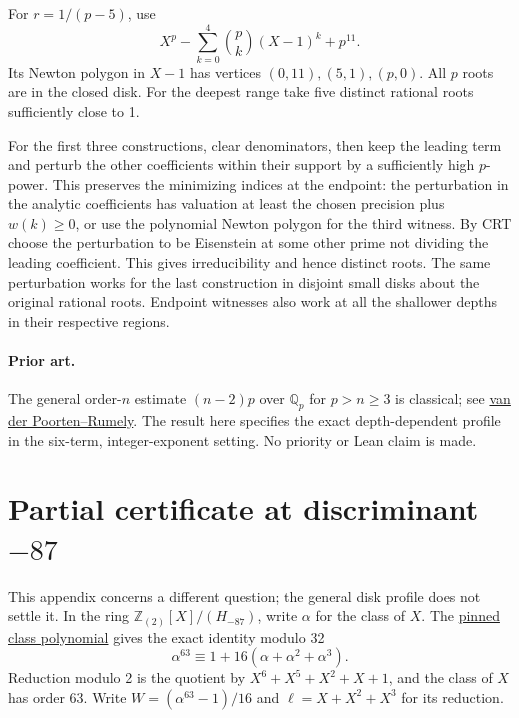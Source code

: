 \documentclass[11pt]{article}
\begin{document}
For \(r=1/(p-5)\), use
\[
 X^p-\sum_{k=0}^4\binom pk(X-1)^k+p^{11}.
\]
Its Newton polygon in \(X-1\) has vertices \((0,11),(5,1),(p,0)\).
All \(p\) roots are in the closed disk. For the deepest range take
five distinct rational roots sufficiently close to 1.

For the first three constructions, clear denominators, then keep
the leading term and perturb the other coefficients within their
support by a sufficiently high \(p\)-power. This preserves the
minimizing indices at the endpoint: the perturbation in the
analytic coefficients has valuation at least the chosen precision
plus \(w(k)\ge0\), or use the polynomial Newton polygon for the
third witness. By CRT choose the perturbation to be Eisenstein at
some other prime not dividing the leading coefficient.
This gives irreducibility and hence distinct roots. The same
perturbation works for the last construction in disjoint small
disks about the original rational roots. Endpoint witnesses also
work at all the shallower depths in their respective regions.

\paragraph{Prior art.}
The general order-\(n\) estimate \((n-2)p\) over \(\mathbb Q_p\)
for \(p>n\ge3\) is classical; see
\href{https://doi.org/10.1112/jlms/s2-36.1.1}{van der Poorten--Rumely}.
The result here specifies the exact depth-dependent profile in the
six-term, integer-exponent setting. No priority or Lean claim is made.
\newpage
\section{Partial certificate at discriminant \(-87\)}
This appendix concerns a different question; the general disk
profile does not settle it. In the ring
\(\mathbb Z_{(2)}[X]/(H_{-87})\), write \(\alpha\) for the class
of \(X\). The
\href{https://github.com/VladimirReshetnikov/ProveIt/blob/10802a6b36/Analysis/GeneralizedRiemannHypothesis/Research/grh_sparse_singular_moduli/checks/five_small_witnesses.json}{pinned class polynomial}
gives the exact identity modulo 32
\[
 \alpha^{63}\equiv1+16(\alpha+\alpha^2+\alpha^3).
\]
Reduction modulo 2 is the quotient by \(X^6+X^5+X^2+X+1\),
and the class of \(X\) has order 63. Write \(W=(\alpha^{63}-1)/16\)
and \(\ell=X+X^2+X^3\) for its reduction.
\end{document}
